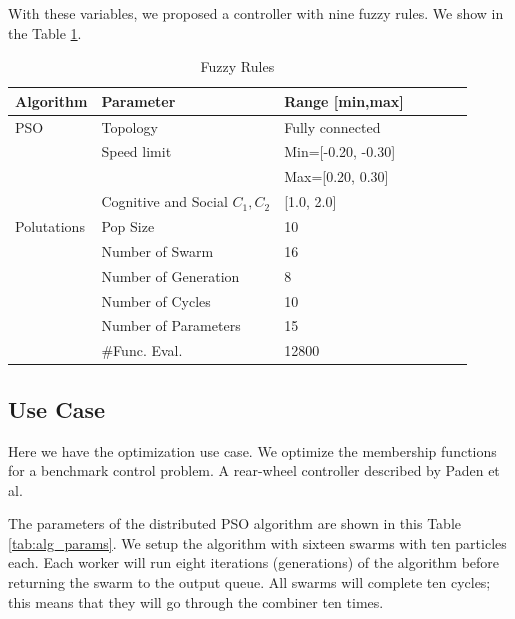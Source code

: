 \documentclass[runningheads]{llncs}
\begin{document}
With these variables, we proposed a controller with nine fuzzy rules. We show in the Table \ref{tab:fuzzy_rules}. 

\begin{table}[ht] 
\caption{Fuzzy Rules}\label{tab:fuzzy_rules}
\setlength{\tabcolsep}{10pt}
\begin{tabular}{l l l l l l l}
\hline
\textbf{Algorithm} & \textbf{Parameter}	& \textbf{Range [min,max]}\\ \hline
PSO & Topology & Fully connected  \\
& Speed limit  & Min=[-0.20, -0.30] \\
&              & Max=[0.20, 0.30]  \\
& Cognitive and Social $C_1,C_2$ &  [1.0, 2.0]  \\ \hline
Polutations & Pop Size                & 10  \\
            & Number of Swarm         & 16 \\
            & Number of Generation    &  8 \\
            & Number of Cycles        & 10   \\
            & Number of Parameters    & 15   \\   
            & \#Func. Eval.           & 12800 \\ \hline
\end{tabular}
\end{table}
\subsection{Use Case}\label{sub:use_case}

Here we have the optimization use case. We optimize the membership functions for a benchmark control problem. A rear-wheel controller described by Paden et al.

The parameters of the distributed PSO algorithm are shown in this Table  \ref{tab:alg_params}.
We setup the algorithm with sixteen swarms with ten particles each. Each worker will run eight iterations (generations) of the algorithm before returning the swarm to the output queue. All swarms will complete ten cycles; this means that they will go through the combiner ten times.
\end{document}
